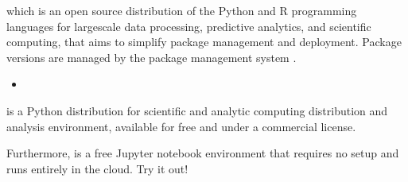 \documentclass[letterpaper,10pt,english]{sphinxmanual}
\begin{document}
which is an open source
distribution of the Python and R programming languages for large\sphinxhyphen{}scale
data processing, predictive analytics, and scientific computing, that
aims to simplify package management and deployment. Package versions
are managed by the package management system .
\begin{itemize}
\item {} 

\end{itemize}

is a Python
distribution for scientific and analytic computing distribution and
analysis environment, available for free and under a commercial
license.

Furthermore,  is a free Jupyter notebook environment that requires
no setup and runs entirely in the cloud. Try it out!
\end{document}
